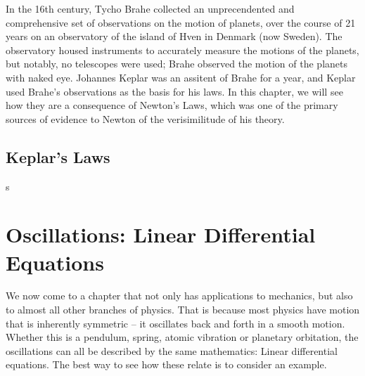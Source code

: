 In the 16th century, Tycho Brahe collected an unprecendented and comprehensive set of observations on the motion of planets, over the course of 21 years on an observatory of the island of Hven in Denmark (now Sweden). The observatory housed instruments to accurately measure the motions of the planets, but notably, no telescopes were used; Brahe observed the motion of the planets with naked eye. Johannes Keplar was an assitent of Brahe for a year, and Keplar used Brahe's observations as the basis for his laws. In this chapter, we will see how they are a consequence of Newton's Laws, which was one of the primary sources of evidence to Newton of the verisimilitude of his theory.

\section{Keplar's Laws}

s










\chapter{Oscillations: Linear Differential Equations}

We now come to a chapter that not only has applications to mechanics, but also to almost all other branches of physics. That is because most physics have motion that is inherently symmetric -- it oscillates back and forth in a smooth motion. Whether this is a pendulum, spring, atomic vibration or planetary orbitation, the oscillations can all be described by the same mathematics: Linear differential equations. The best way to see how these relate is to consider an example.

